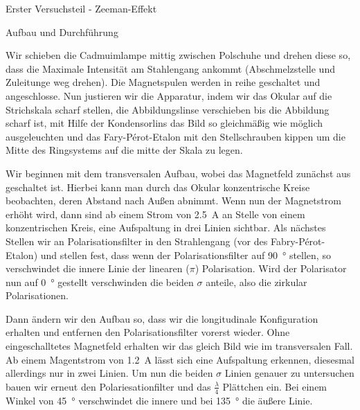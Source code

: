 \documentclass[pdftex, a4paper,11pt, twoside, ngerman]{report}
\begin{document}
  \begin{chapter}{Erster Versuchsteil - Zeeman-Effekt}
    \label{chp:Photoeffekt}
   
   
   
    \begin{section}{Aufbau und Durchführung}
      \label{chp:photoeffekt:sec:AufbauJustage}


      Wir schieben die Cadmuimlampe mittig zwischen Polschuhe und drehen diese so, dass die Maximale Intensität am Stahlengang ankommt (Abschmelzstelle und Zuleitunge weg drehen).
      Die Magnetspulen werden in reihe geschaltet und angeschlosse.
      Nun justieren wir die Apparatur, indem wir das Okular auf die Strichskala scharf stellen, die Abbildungslinse verschieben bis die Abbildung scharf ist, mit Hilfe der Kondensorlins das Bild so gleichmäßig wie möglich ausgeleuchten und das Fary-Pérot-Etalon mit den Stellschrauben kippen um die Mitte des Ringsystems auf die mitte der Skala zu legen.

      Wir beginnen mit dem transversalen Aufbau, wobei das Magnetfeld zunächst aus geschaltet ist.
      Hierbei kann man durch das Okular konzentrische Kreise beobachten, deren Abstand nach Außen abnimmt.
      Wenn nun der Magnetstrom erhöht wird, dann sind ab einem Strom von \SI{2,5}{\ampere} an Stelle von einem konzentrischen Kreis, eine Aufspaltung in drei Linien sichtbar.
      Als nächstes Stellen wir an Polarisationsfilter in den Strahlengang (vor des Fabry-Pérot-Etalon) und stellen fest, dass wenn der Polarisationsfilter auf \SI{90}{\degree} stellen, so verschwindet die innere Linie der linearen ($\pi$) Polarisation. 
      Wird der Polarisator nun auf \SI{0}{\degree} gestellt verschwinden die beiden $\sigma$ anteile, also die zirkular Polarisationen.

      Dann ändern wir den Aufbau so, dass wir die longitudinale Konfiguration erhalten und entfernen den Polarisationsfilter vorerst wieder.
      Ohne eingeschalltetes Magnetfeld erhalten wir das gleich Bild wie im transversalen Fall.
      Ab einem Magentstrom von \SI{1,2}{\ampere} lässt sich eine Aufspaltung erkennen, diesesmal allerdings nur in zwei Linien.
      Um nun die beiden $\sigma$ Linien genauer zu untersuchen bauen wir erneut den Polariesationfilter und das $\frac \lambda 4$ Plättchen ein.
      Bei einem Winkel von \SI{45}{\degree} verschwindet die innere und bei \SI{135}{\degree} die äußere Linie.
      

\end{section}
\end{chapter}
\end{document}
